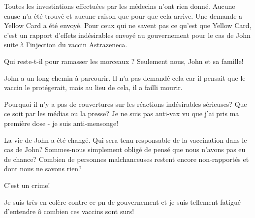 {Toutes les investiations effectuées par les médecins n'ont rien donné. Aucune
cause n'a été trouvé et aucune raison que pour que cela arrive. Une demande a
Yellow Card a été envoyé. Pour ceux qui ne savent pas ce qu'est que Yellow Card,
c'est un rapport d'effets indésirables envoyé au gouvernement pour le cas de
John suite à l'injection du vaccin Astrazeneca.

Qui reste-t-il pour ramasser les morceaux ? Seulement nous, John et sa famille!

John a un long chemin à parcourir. Il n'a pas demandé cela car il pensait que le
vaccin le protégerait, mais au lieu de cela, il a failli mourir.

Pourquoi il n'y a pas de couvertures sur les réactions indésirables sérieuses?
Que ce soit par les médias ou la presse? Je ne suis pas anti-vax vu que j'ai
pris ma première dose - je suis anti-mensonge!

La vie de John a été changé. Qui sera tenu responsable de la vaccination dans le
cas de John? Sommes-nous simplement obligé de pensé que nous n'avons pas eu de
chance? Combien de personnes malchanceuses restent encore non-rapportés et dont
nous ne savons rien?

C'est un crime!

Je suis très en colère contre ce pn de gouvernement et je suis tellement fatigué
d'entendre ô combien ces vaccins sont surs!

}
